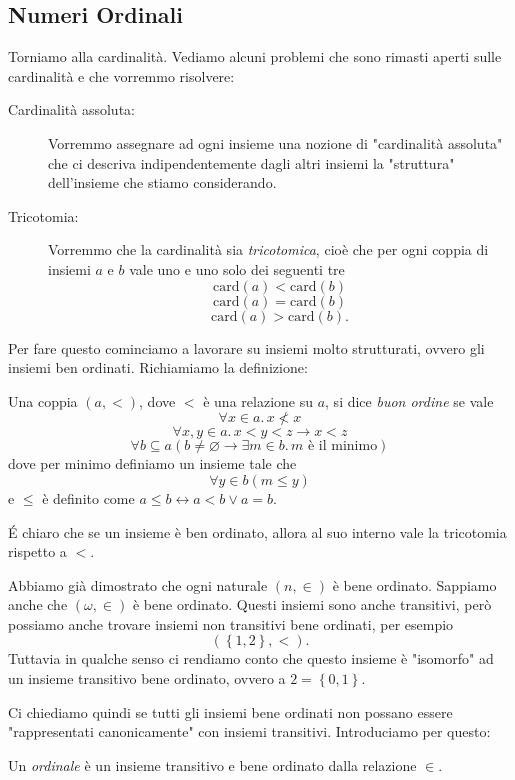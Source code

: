\documentclass[11pt]{scrartcl}
\newcommand{\eset}{\varnothing}
\begin{document}
 	\subsection{Numeri Ordinali}
 	Torniamo alla cardinalità. Vediamo alcuni problemi che sono rimasti aperti sulle cardinalità e che vorremmo risolvere:
 	\begin{description}
 		\item[Cardinalità assoluta:] Vorremmo assegnare ad ogni insieme una nozione di "cardinalità assoluta" che ci descriva indipendentemente dagli altri insiemi la "struttura" dell'insieme che stiamo considerando.
 		\item[Tricotomia:] Vorremmo che la cardinalità sia \textit{tricotomica}, cioè che per ogni coppia di insiemi $a$ e $b$ vale uno e uno solo dei seguenti tre
 		$$\text{card}(a)<\text{card}(b)$$
 		$$\text{card}(a)=\text{card}(b)$$
 		$$\text{card}(a)>\text{card}(b).$$
 	\end{description}
 	Per fare questo cominciamo a lavorare su insiemi molto strutturati, ovvero gli insiemi ben ordinati. Richiamiamo la definizione:
 	\begin{definition}
 		Una coppia $(a,<)$, dove $<$ è una relazione su $a$, si dice \textit{buon ordine} se vale
 		$$\forall x\in a .\, x\not < x$$
 		$$\forall x,y\in a.\, x<y<z \to x<z$$
 		$$\forall b\subseteq a\left(b\ne \eset \to \exists m\in b.\, m\text{ è il minimo}\right)$$
 		dove per minimo definiamo un insieme tale che
 		$$\forall y\in b\left(m\le y\right)$$ 
 		e $\le $ è definito come $a\le b\leftrightarrow a<b \lor a=b$.
 	\end{definition}
 	\'E chiaro che se un insieme è ben ordinato, allora al suo interno vale la tricotomia rispetto a $<$. 
 	\begin{example}
 		Abbiamo già dimostrato che ogni naturale $(n,\in)$ è bene ordinato. Sappiamo anche che $(\omega,\in)$ è bene ordinato. Questi insiemi sono anche transitivi, però possiamo anche trovare insiemi non transitivi bene ordinati, per esempio
 		$$\left(\left\{1,2\right\},<\right).$$
 		Tuttavia in qualche senso ci rendiamo conto che questo insieme è "isomorfo" ad un insieme transitivo bene ordinato, ovvero a $2=\left\{0,1\right\}$.
 	\end{example}
 	Ci chiediamo quindi se tutti gli insiemi bene ordinati non possano essere "rappresentati canonicamente" con insiemi transitivi. Introduciamo per questo:
 	\begin{definition}
 		Un \textit{ordinale} è un insieme transitivo e bene ordinato dalla relazione $\in$.
 	\end{definition}
\end{document}
